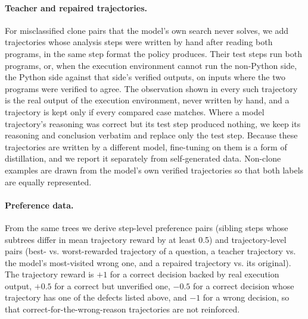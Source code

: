 \paragraph{Teacher and repaired trajectories.} For misclassified clone pairs
that the model's own search never solves, we add trajectories whose analysis
steps were written by hand after reading both programs, in the same step
format the policy produces. Their test steps run both programs, or, when the
execution environment cannot run the non-Python side, the Python side
against that side's verified outputs, on inputs where the two programs were
verified to agree. The observation shown in every such trajectory is the
real output of the execution environment, never written by hand, and a
trajectory is kept only if every compared case matches. Where a model
trajectory's reasoning was correct but its test step produced nothing, we
keep its reasoning and conclusion verbatim and replace only the test step.
Because these trajectories are written by a different model, fine-tuning on
them is a form of distillation, and we report it separately from
self-generated data. Non-clone examples are drawn from the model's own
verified trajectories so that both labels are equally represented.

\paragraph{Preference data.} From the same trees we derive step-level
preference pairs (sibling steps whose subtrees differ in mean trajectory
reward by at least 0.5) and trajectory-level pairs (best- vs.
worst-rewarded trajectory of a question, a teacher trajectory vs. the model's
most-visited wrong one, and a repaired trajectory vs. its original). The
trajectory reward is $+1$ for a correct decision backed by real execution
output, $+0.5$ for a correct but unverified one, $-0.5$ for a correct
decision whose trajectory has one of the defects listed above, and $-1$ for
a wrong decision, so that correct-for-the-wrong-reason trajectories are not
reinforced.


